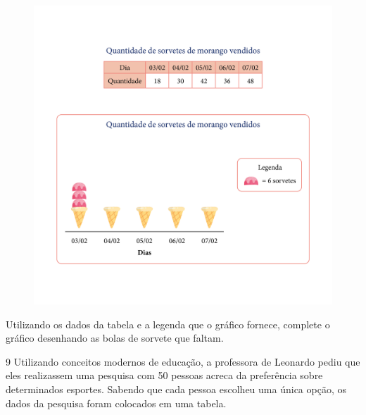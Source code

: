 \begin{figure}[htpb!]
\includegraphics[width=\textwidth]{../ilustracoes/MAT5/SAEB_5ANO_MAT_figura61.png}
\end{figure}

Utilizando os dados da tabela e a legenda que o gráfico fornece,
complete o gráfico desenhando as bolas de sorvete que faltam.


\num{9} Utilizando conceitos modernos de educação, a professora de Leonardo
pediu que eles realizassem uma pesquisa com 50 pessoas acreca da
preferência sobre determinados esportes. Sabendo que cada pessoa
escolheu uma única opção, os dados da pesquisa foram colocados em uma tabela.

